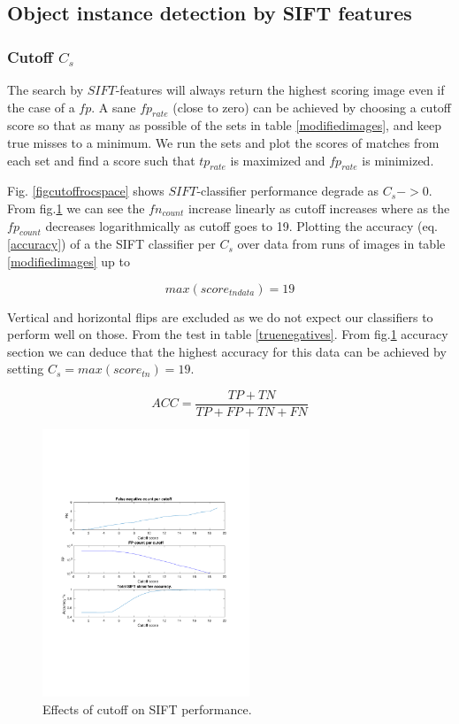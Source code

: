 \documentclass[english,12pt,a4paper,pdftex,elec,utf8]{aaltothesis}
\begin{document}
\subsection{Object instance detection by SIFT features}

\subsubsection{Cutoff $C_{s}$}
The search by $SIFT$-features will always return the highest scoring image even if the case of a $fp$. A sane $fp_{rate}$ (close to zero) can be achieved by choosing a cutoff score so that as many as possible of the sets in table \ref{modifiedimages}, and keep true misses to a minimum. We run the sets and plot the scores of matches from each set and find a score such that $tp_{rate}$ is maximized and $fp_{rate}$ is minimized.

Fig. \ref{figcutoffrocspace} shows $SIFT$-classifier performance degrade as $C_{s}->0$. From fig.\ref{figcutoff} we can see the $fn_{count}$ increase linearly as cutoff increases where as the $fp_{count}$ decreases logarithmically as cutoff goes to 19. Plotting the accuracy (eq. \ref{accuracy}) of a the SIFT classifier per $C_{s}$ over data from runs of images in table \ref{modifiedimages} up to

\begin{equation}\label{maxtnscore}
max(score_{tndata}) = 19
\end{equation}

Vertical and horizontal flips are excluded as we do not expect our classifiers to perform well on those. From the test in table \ref{truenegatives}. From fig.\ref{figcutoff} accuracy section we can deduce that the highest accuracy for this data can be achieved by setting $C_{s} = max(score_{tn}) = 19$.

\begin{equation} \label{accuracy}
ACC = \frac{TP +TN}{TP + FP + TN + FN}
\end{equation}

\begin{figure}[htb]
\begin{center}
\includegraphics[height=8cm]{figures/SIFTCountROC}
\end{center}
\caption{ Effects of cutoff on SIFT performance. }
\label{figcutoff}
\end{figure}
\end{document}
